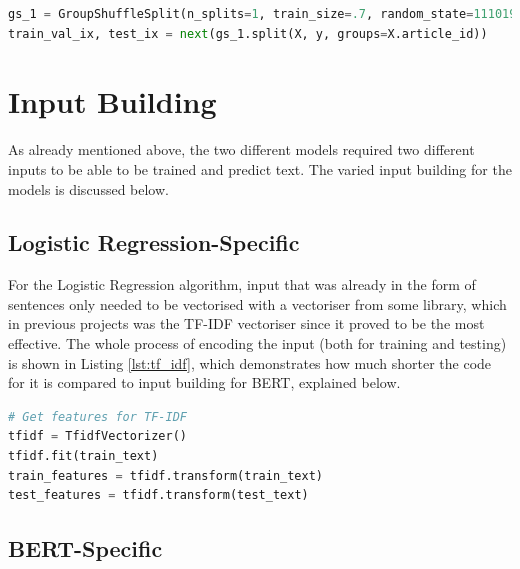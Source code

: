 \documentclass{l4proj}
\begin{document}
\begin{lstlisting}[language=python, float, caption={Using the {\normalfont sci-kit learn GroupShuffleSplit} library to split the dataset into a training and validation set\protect\footnotemark and a testing set.}, label=lst:groupsplit]
gs_1 = GroupShuffleSplit(n_splits=1, train_size=.7, random_state=111019)
train_val_ix, test_ix = next(gs_1.split(X, y, groups=X.article_id))
\end{lstlisting}



\section{Input Building}
\label{sec:imp_input}

As already mentioned above, the two different models required two different inputs to be able to be trained and predict text. The varied input building for the models is discussed below.

\subsection{Logistic Regression-Specific}

For the Logistic Regression algorithm, input that was already in the form of sentences only needed to be vectorised with a vectoriser from some library, which in previous projects was the TF-IDF vectoriser since it proved to be the most effective. The whole process of encoding the input (both for training and testing) is shown in Listing \ref{lst:tf_idf}, which demonstrates how much shorter the code for it is compared to input building for BERT, explained below.

\begin{lstlisting}[language=python, float, caption={Vectorising input for the Logistic Regression algorithm with TF-IDF.}, label=lst:tf_idf]
# Get features for TF-IDF
tfidf = TfidfVectorizer()
tfidf.fit(train_text)
train_features = tfidf.transform(train_text)
test_features = tfidf.transform(test_text)
\end{lstlisting}

\subsection{BERT-Specific}
\end{document}
